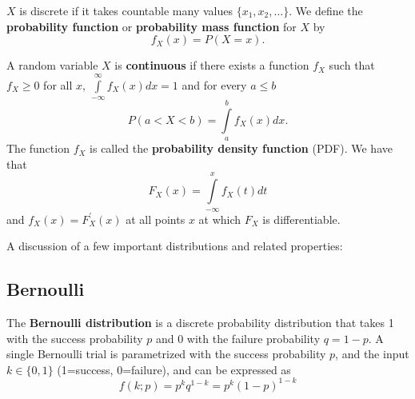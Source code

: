 \begin{definition}
$X$ is discrete if it takes countable many values $\{x_{1},x_{2},\ldots\}$. We define the {\bf probability function} or
{\bf probability mass function} for $X$ by
\begin{equation*}
	f_{X}(x)= P (X=x).
\end{equation*}
\end{definition}


\fbox
{\begin{minipage}[h]{0.9\linewidth} 
\begin{definition}
A random variable $X$ is {\bf continuous} if there exists a function $f_{X}$ such that $f_{X} \geq 0$ for all $x$,
$\int\limits_{-\infty}^{\infty} f_{X}(x)dx = 1$ and for every $a\leq b$
\begin{equation}
P(a < X < b) = \int\limits_{a}^{b}f_{X}(x)dx.
\end{equation}
The function $f_{X}$ is called the {\bf probability density function} (PDF). We have that
\begin{equation*}
F_{X}(x) = \int\limits_{-\infty}^{x}f_{X}(t)dt
\end{equation*}
and $f_{X}(x)=F_{X}^{'}(x)$ at all points $x$ at which $F_{X}$ is differentiable.
\end{definition}
\end{minipage}}


\vspace{0.1in}
A discussion of a few important distributions and related properties:

\subsection{\label{bernoulli} Bernoulli}
The {\bf Bernoulli distribution} is a discrete probability distribution that takes 1 with the success probability $p$ and 0 with the failure probability $q=1-p$.
A single Bernoulli trial is parametrized with the success probability $p$, and the input $k\in \{0,1\}$ (1=success, 0=failure), and can be expressed as
\begin{equation*}
\label{bernoulli-eq}
f(k;p) = p^kq^{1-k} = p^k(1-p)^{1-k}
\end{equation*}

